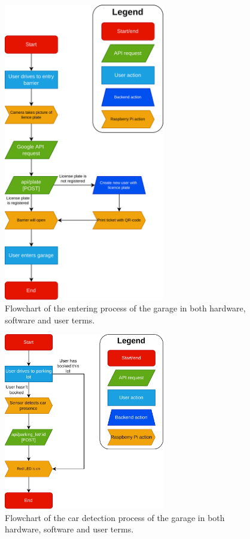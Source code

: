 \begin{appendices}
\begin{figure}[htp]
    \centering
    \includegraphics[width=7cm]{images/garage_enter.drawio.png}
    \caption{Flowchart of the entering process of the garage in both hardware, software and user terms.}
    \label{fig:garage-enter}
\end{figure}

\begin{figure}[htp]
    \centering
    \includegraphics[width=7cm]{images/car_detection.drawio.png}
    \caption{Flowchart of the car detection process of the garage in both hardware, software and user terms.}
    \label{fig:car-detection}
\end{figure}


\end{appendices}
